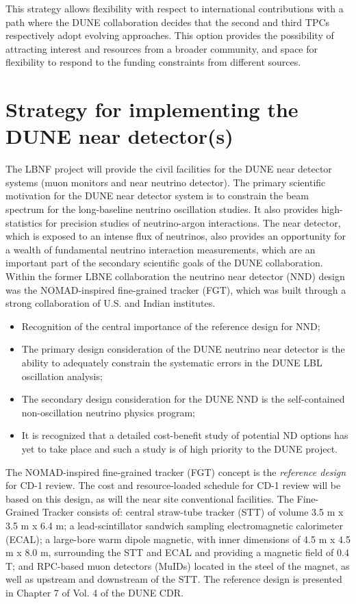 This strategy allows flexibility with respect to international contributions with 
a path where the DUNE collaboration decides that the second and third TPCs respectively 
adopt evolving approaches. This option provides the possibility of attracting interest 
and resources from a broader community, and space for flexibility to respond to 
the funding constraints from different sources. 

\section{Strategy for implementing the DUNE near detector(s)}

The LBNF project will provide the civil facilities for the DUNE near detector systems 
(muon monitors and near neutrino detector). The primary scientific motivation for 
the DUNE near detector system is to constrain the beam spectrum for the long-baseline 
neutrino oscillation studies. It also provides high-statistics for precision studies 
of neutrino-argon interactions. The near detector, which is exposed to an intense 
flux of neutrinos, also provides an opportunity for a wealth of fundamental neutrino 
interaction measurements, which are an important part of the secondary scientific 
goals of the DUNE collaboration. Within the former LBNE collaboration the neutrino 
near detector (NND) design was the NOMAD-inspired fine-grained tracker (FGT), which 
was built through a strong collaboration of U.S. and Indian institutes.

\begin{itemize}
\item Recognition of the central importance of the reference design for NND;

\item  The primary design consideration of the DUNE neutrino near detector is the 
ability to adequately constrain the systematic errors in the DUNE LBL oscillation 
analysis; 
\item The secondary design consideration for the DUNE NND is the self-contained non-oscillation 
neutrino physics program;

\item It is recognized that a detailed cost-benefit study of potential ND options 
has yet to take place and such a study is of high priority to the DUNE project.
\end{itemize}

The NOMAD-inspired fine-grained tracker (FGT) concept is the \textit{reference 
design} for CD-1 review. The cost and resource-loaded schedule for CD-1 review 
will be based on this design, as will the near site conventional facilities. The 
Fine-Grained Tracker consists of:  central straw-tube tracker (STT) of volume 3.5 
m x 3.5 m x 6.4 m; a lead-scintillator sandwich sampling electromagnetic calorimeter 
(ECAL); a large-bore warm dipole magnetic, with inner dimensions of 4.5 m x 4.5 
m x 8.0 m, surrounding the STT and ECAL and providing a magnetic field of 0.4 T; 
and RPC-based muon detectors (MuIDs) located in the steel of the magnet, as well 
as upstream and downstream of the STT. The reference design is presented in Chapter 
7 of Vol. 4 of the DUNE CDR. 

